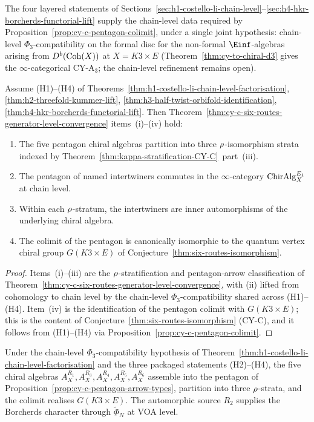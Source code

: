 The four layered statements of
Sections~\ref{sec:h1-costello-li-chain-level}--\ref{sec:h4-hkr-borcherds-functorial-lift}
supply the chain-level data required by
Proposition~\ref{prop:cy-c-pentagon-colimit}, under a single joint hypothesis:
chain-level $\Phi_3$-compatibility on the formal disc for the non-formal
$\Einf$-algebras arising from $D^b(\mathrm{Coh}(X))$ at $X = K3 \times E$
(Theorem~\ref{thm:cy-to-chiral-d3} gives the $\infty$-categorical CY-A$_3$;
the chain-level refinement remains open).

\begin{theorem}
\label{thm:cy-c-pentagon-convergence-unconditional}
Assume (H1)--(H4) of
Theorems~\ref{thm:h1-costello-li-chain-level-factorisation},
\ref{thm:h2-threefold-kummer-lift},
\ref{thm:h3-half-twist-orbifold-identification},
\ref{thm:h4-hkr-borcherds-functorial-lift}. Then
Theorem~\ref{thm:cy-c-six-routes-generator-level-convergence}
items~(i)--(iv) hold:
\begin{enumerate}[label=\textup{(\roman*)}]
 \item The five pentagon chiral algebras partition into three
 $\rho$-isomorphism strata indexed by
 Theorem~\ref{thm:kappa-stratification-CY-C}~part~(iii).
 \item The pentagon of named intertwiners commutes in the $\infty$-category
 $\mathrm{ChirAlg}^{E_{1}}_X$ at chain level.
 \item Within each $\rho$-stratum, the intertwiners are inner automorphisms
 of the underlying chiral algebra.
 \item The colimit of the pentagon is canonically isomorphic to the quantum
 vertex chiral group $G(K3 \times E)$ of
 Conjecture~\ref{thm:six-routes-isomorphism}.
\end{enumerate}
\end{theorem}

\begin{proof}
Items~(i)--(iii) are the $\rho$-stratification and pentagon-arrow
classification of
Theorem~\ref{thm:cy-c-six-routes-generator-level-convergence}, with (ii)
lifted from cohomology to chain level by the chain-level
$\Phi_3$-compatibility shared across (H1)--(H4). Item~(iv) is the
identification of the pentagon colimit with $G(K3 \times E)$; this is the
content of Conjecture~\ref{thm:six-routes-isomorphism} (CY-C), and it
follows from (H1)--(H4) via
Proposition~\ref{prop:cy-c-pentagon-colimit}.
\end{proof}

\begin{remark}
\label{rem:cy-c-generator-level-unconditional}
Under the chain-level $\Phi_3$-compatibility hypothesis of
Theorem~\ref{thm:h1-costello-li-chain-level-factorisation} and the
three packaged statements (H2)--(H4), the five chiral algebras
$A_X^{R_1}, A_X^{R_3}, A_X^{R_4}, A_X^{R_5}, A_X^{R_6}$ assemble into the
pentagon of Proposition~\ref{prop:cy-c-pentagon-arrow-types}, partition into
three $\rho$-strata, and the colimit realises $G(K3 \times E)$. The
automorphic source $R_2$ supplies the Borcherds character through
$\widetilde{\Phi}_N$ at VOA level.
\end{remark}

